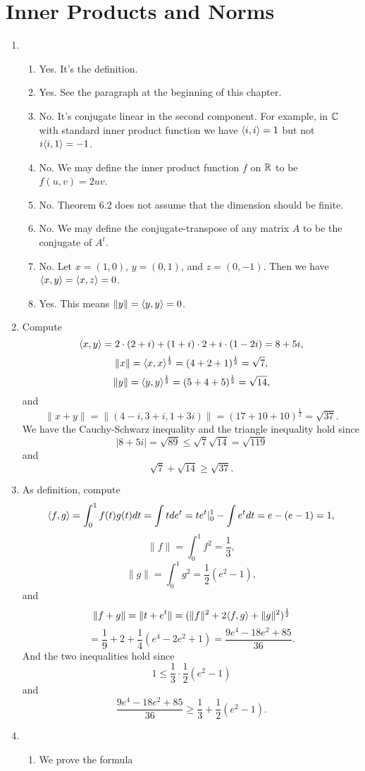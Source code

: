 \section{Inner Products and Norms}
\begin{enumerate}
\item \begin{enumerate}
\item Yes. It's the definition.
\item Yes. See the paragraph at the beginning of this chapter.
\item No. It's conjugate linear in the second component. For example, in $\mathbb{C}$ with standard inner product function we have $\langle i,i\rangle =1$ but not $i\langle i,1\rangle =-1$.
\item No. We may define the inner product function $f$ on $\mathbb{R}$ to be $f(u,v)=2uv$.
\item No. Theorem 6.2 does not assume that the dimension should be finite.
\item No. We may define the conjugate-transpose of any matrix $A$ to be the conjugate of $A^t$.
\item No. Let $x=(1,0)$, $y=(0,1)$, and $z=(0,-1)$. Then we have $\langle x,y\rangle =\langle x,z\rangle =0$.
\item Yes. This means $\|y\|=\langle y,y\rangle =0$.
\end{enumerate}
\item Compute 
\[\langle x,y\rangle =2\cdot (2+i)+(1+i)\cdot 2+i\cdot (1-2i)=8+5i,\] 
\[\|x\|=\langle x,x\rangle ^{\frac{1}{2}}=(4+2+1)^{\frac{1}{2}}=\sqrt{7},\]
\[\|y\|=\langle y,y\rangle ^{\frac{1}{2}}=(5+4+5)^{\frac{1}{2}}=\sqrt{14},\]
and 
\[\|x+y\|=\|(4-i,3+i,1+3i)\|=(17+10+10)^{\frac{1}{2}}=\sqrt{37}.\]
We have the Cauchy-Schwarz inequality and the triangle inequality hold since
\[|8+5i|=\sqrt{89}\leq \sqrt{7}\sqrt{14}=\sqrt{119}\]
and 
\[\sqrt{7}+\sqrt{14}\geq \sqrt{37}.\]
\item As definition, compute
\[\langle f,g\rangle =\int_0^1{f(t)g(t)dt}=\int{tde^t}=te^t|_0^1-\int{e^tdt}=e-(e-1)=1,\]
\[\|f\|=\int_0^1{f^2}=\frac{1}{3},\]
\[\|g\|=\int_0^1{g^2}=\frac{1}{2}(e^2-1),\]
and 
\[\|f+g\|=\|t+e^t\|=(\|f\|^2+2\langle f,g\rangle +\|g\|^2)^{\frac{1}{2}}\]
\[=\frac{1}{9}+2+\frac{1}{4}(e^4-2e^2+1)=\frac{9e^4-18e^2+85}{36}.\]
And the two inequalities hold since
\[1\leq\frac{1}{3}\cdot \frac{1}{2}(e^2-1)\]
and 
\[\frac{9e^4-18e^2+85}{36}\geq \frac{1}{3}+\frac{1}{2}(e^2-1).\]
\item \begin{enumerate}
\item We prove the formula 

\end{enumerate}
\end{enumerate}
